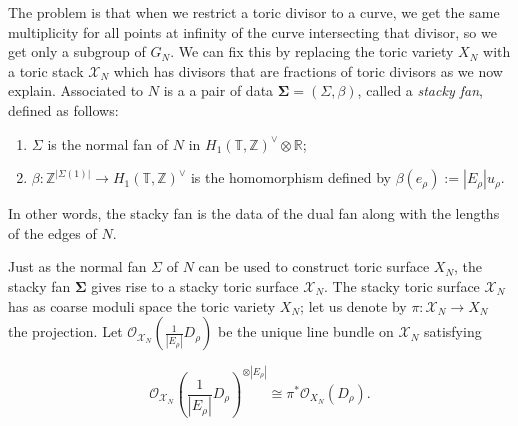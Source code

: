 \documentclass[11pt]{article} %
\theoremstyle{definition}
\newcommand{\Z}{{\mathbb Z}}
\newcommand{\R}{{\mathbb R}}
\newcommand{\T}{{\mathbb T}}
\newcommand{\ra}{\rightarrow}
\begin{document}
The problem is that when we restrict a toric divisor to a curve, we get the same multiplicity for all points at infinity of the curve intersecting that divisor, so we get only a subgroup of $G_N$. We can fix this by replacing the toric variety $X_N$ with a toric stack $\mathscr{X}_N$ which has divisors that are fractions of toric divisors as we now explain. Associated to $N$ is a a pair of data $\boldsymbol \Sigma=(\Sigma, \beta)$, called a \textit{stacky fan}, defined as follows:
\begin{enumerate}
    \item $\Sigma$ is the normal fan of $N$ in $H_1(\T,\Z)^\vee \otimes \R$;
    \item $\beta :\Z^{|\Sigma(1)|} \ra H_1(\T,\Z)^\vee$ is the homomorphism defined by $\beta(e_\rho):=|E_\rho| u_\rho$.
\end{enumerate}
In other words, the stacky fan is the data of the dual fan along with the lengths of the edges of $N$.

Just as the normal fan $\Sigma$ of $N$ can be used to construct toric surface $X_N$,  the stacky fan $\boldsymbol \Sigma$ gives rise to a stacky toric surface $\mathscr X_N$. The stacky toric surface $\mathscr X_N$ has as coarse moduli space the toric variety $X_N$; let us denote by $\pi:\mathscr X_N \ra X_N$ the projection. Let $\mathcal O_{\mathscr X_N} \left(\frac{1}{|E_\rho|}D_{\rho}\right)$ be the unique line bundle on $\mathscr X_N$ satisfying

$$\mathcal O_{\mathscr X_N} \left(\frac{1}{|E_\rho|}D_{\rho}\right)^{\otimes |E_\rho|} \cong \pi^*\mathcal O_{X_N}(D_\rho).$$
\end{document}

